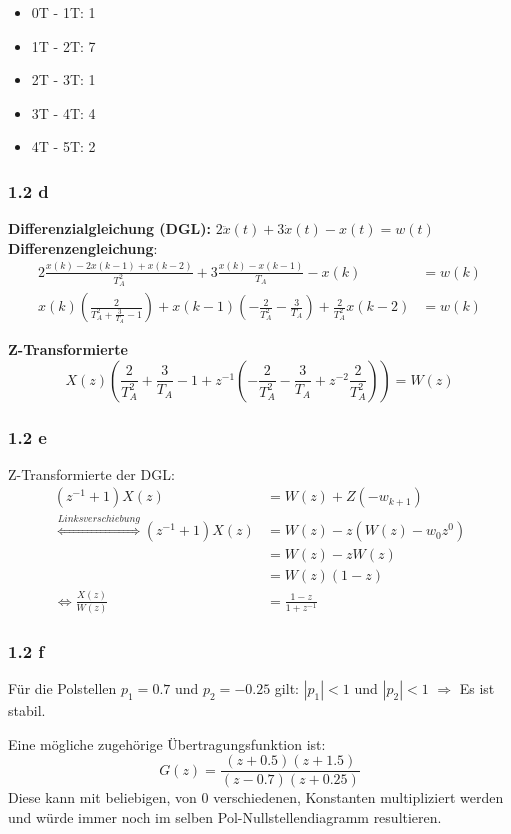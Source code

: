 \documentclass[a4paper]{scrartcl}
\begin{document}
  \begin{itemize}
      \item 0T - 1T: 1
      \item 1T - 2T: 7
      \item 2T - 3T: 1
      \item 3T - 4T: 4
      \item 4T - 5T: 2
  \end{itemize}


  \subsubsection*{1.2 d}
  \textbf{Differenzialgleichung (DGL):} $2 \ddot{x}(t) + 3 \dot{x}(t) - x(t) = w(t)$\\
  \textbf{Differenzengleichung}:
  \begin{align}
      2 \frac{x(k) - 2x(k-1) + x(k-2)}{T_A^2} + 3 \frac{x(k) - x(k-1)}{T_A} - x(k) &= w(k)\\
      x(k) (\frac{2}{T_A^2 + \frac{3}{T_A} - 1}) + x(k-1)(-\frac{2}{T_A^2} - \frac{3}{T_A}) + \frac{2}{T_A^2} x(k-2) &= w(k)
  \end{align}

  \textbf{Z-Transformierte}
  \[X(z) (\frac{2}{T_A^2} + \frac{3}{T_A} - 1 + z^{-1} (- \frac{2}{T_A^2} - \frac{3}{T_A} + z^{-2} \frac{2}{T_A^2})) = W(z)\]

  \subsubsection*{1.2 e}
  Z-Transformierte der DGL:
  \begin{align}
      (z^{-1} + 1) X(z) &= W(z) + Z(-w_{k+1})\\
      \overset{Linksverschiebung}{\Leftrightarrow} (z^{-1} + 1) X(z) &= W(z) - z(W(z) - w_0 z^0)\\
      &= W(z)- z W(z)\\
      &= W(z) (1-z)\\
      \Leftrightarrow \frac{X(z)}{W(z)} &= \frac{1-z}{1+z^{-1}}
  \end{align}

  \subsubsection*{1.2 f}
  Für die Polstellen $p_1 = 0.7$ und $p_2 = -0.25$ gilt: $|p_1| < 1$ und $|p_2| < 1$
  $\Rightarrow$ Es ist stabil.

  Eine mögliche zugehörige Übertragungsfunktion ist:
  \[G(z) = \frac{(z+0.5)(z+1.5)}{(z-0.7) (z+0.25)}\]
  Diese kann mit beliebigen, von 0 verschiedenen, Konstanten multipliziert
  werden und würde immer noch im selben Pol-Nullstellendiagramm resultieren.
\end{document}
